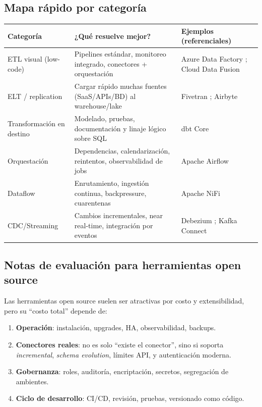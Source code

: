 \documentclass[12pt]{article}
\begin{document}
\subsection{Mapa rápido por categoría}
\begin{longtable}{@{}p{3.2cm}p{5.2cm}p{6.1cm}@{}}
\toprule
\textbf{Categoría} & \textbf{¿Qué resuelve mejor?} & \textbf{Ejemplos (referenciales)} \\
\midrule
ETL visual (low-code) & Pipelines estándar, monitoreo integrado, conectores + orquestación & Azure Data Factory \cite{ms_adf_intro}; Cloud Data Fusion \cite{gcp_data_fusion_overview} \\
ELT / replication & Cargar rápido muchas fuentes (SaaS/APIs/BD) al warehouse/lake & Fivetran \cite{fivetran_getting_started}; Airbyte \cite{airbyte_docs} \\
Transformación en destino & Modelado, pruebas, documentación y linaje lógico sobre SQL & dbt Core \cite{dbt_intro} \\
Orquestación & Dependencias, calendarización, reintentos, observabilidad de jobs & Apache Airflow \cite{airflow_what_is} \\
Dataflow & Enrutamiento, ingestión continua, backpressure, cuarentenas & Apache NiFi \cite{nifi_overview} \\
CDC/Streaming & Cambios incrementales, near real-time, integración por eventos & Debezium \cite{debezium_home}; Kafka Connect \cite{kafka_connect_user_guide} \\
\bottomrule
\end{longtable}

\subsection{Notas de evaluación para herramientas open source}
Las herramientas open source suelen ser atractivas por costo y extensibilidad, pero su “costo total” depende de:

\begin{enumerate}[label=\textbf{O\arabic*.}, leftmargin=*]
  \item \textbf{Operación}: instalación, upgrades, HA, observabilidad, backups.
  \item \textbf{Conectores reales}: no es solo “existe el conector”, sino si soporta \textit{incremental}, \textit{schema evolution}, límites API, y autenticación moderna.
  \item \textbf{Gobernanza}: roles, auditoría, encriptación, secretos, segregación de ambientes.
  \item \textbf{Ciclo de desarrollo}: CI/CD, revisión, pruebas, versionado como código.
\end{enumerate}
\end{document}
